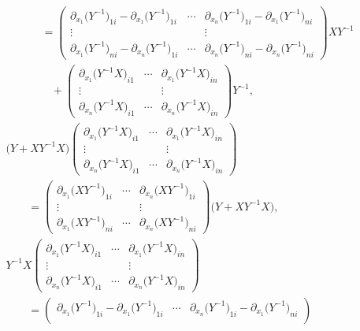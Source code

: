 \documentclass[10pt,a4paper]{amsart}
\numberwithin{equation}{section}
\begin{document}
\begin{align}
&\phantom{\qquad-}{}=
\begin{pmatrix}
\partial_{x_1}\bigl(Y^{-1}\bigr)_{1i}-\partial_{x_1}\bigl(Y^{-1}\bigr)_{1i} & \cdots & \partial_{x_n}\bigl(Y^{-1}\bigr)_{1i}-\partial_{x_1}\bigl(Y^{-1}\bigr)_{ni} \\
\vdots & & \vdots \\
\partial_{x_1}\bigl(Y^{-1}\bigr)_{ni}-\partial_{x_n}\bigl(Y^{-1}\bigr)_{1i} & \cdots & \partial_{x_n}\bigl(Y^{-1}\bigr)_{ni}-\partial_{x_n}\bigl(Y^{-1}\bigr)_{ni}
\end{pmatrix}
XY^{-1}\nonumber \\
&\phantom{\qquad-=}{}+
\begin{pmatrix}
\partial_{x_1}\bigl(Y^{-1}X\bigr)_{i1} & \cdots & \partial_{x_1}\bigl(Y^{-1}X\bigr)_{in} \\
\vdots & & \vdots \\
\partial_{x_n}\bigl(Y^{-1}X\bigr)_{i1} & \cdots & \partial_{x_n}\bigl(Y^{-1}X\bigr)_{in}
\end{pmatrix}
Y^{-1},\label{K2}
\\
& \bigl(Y+XY^{-1}X\bigr)
\begin{pmatrix}
\partial_{x_1}\bigl(Y^{-1}X\bigr)_{i1} & \cdots & \partial_{x_1}\bigl(Y^{-1}X\bigr)_{in} \\
\vdots & & \vdots \\
\partial_{x_n}\bigl(Y^{-1}X\bigr)_{i1} & \cdots & \partial_{x_n}\bigl(Y^{-1}X\bigr)_{in}
\end{pmatrix}\nonumber \\
&\qquad=
\begin{pmatrix}
\partial_{x_1}\bigl(XY^{-1}\bigr)_{1i} & \cdots & \partial_{x_n}\bigl(XY^{-1}\bigr)_{1i} \\
\vdots & & \vdots \\
\partial_{x_1}\bigl(XY^{-1}\bigr)_{ni} & \cdots & \partial_{x_n}\bigl(XY^{-1}\bigr)_{ni}
\end{pmatrix}
\bigl(Y+XY^{-1}X\bigr), \label{K3}
\\
& Y^{-1}X
\begin{pmatrix}
\partial_{x_1}\bigl(Y^{-1}X\bigr)_{i1} & \cdots & \partial_{x_1}\bigl(Y^{-1}X\bigr)_{in} \\
\vdots & & \vdots \\
\partial_{x_n}\bigl(Y^{-1}X\bigr)_{i1} & \cdots & \partial_{x_n}\bigl(Y^{-1}X\bigr)_{in}
\end{pmatrix}\nonumber \\
&\qquad=
\begin{pmatrix}
\partial_{x_1}\bigl(Y^{-1}\bigr)_{1i}-\partial_{x_1}\bigl(Y^{-1}\bigr)_{1i} & \cdots & \partial_{x_n}\bigl(Y^{-1}\bigr)_{1i}-\partial_{x_1}\bigl(Y^{-1}\bigr)_{ni} \\

\end{pmatrix}
\end{align}
\end{document}

